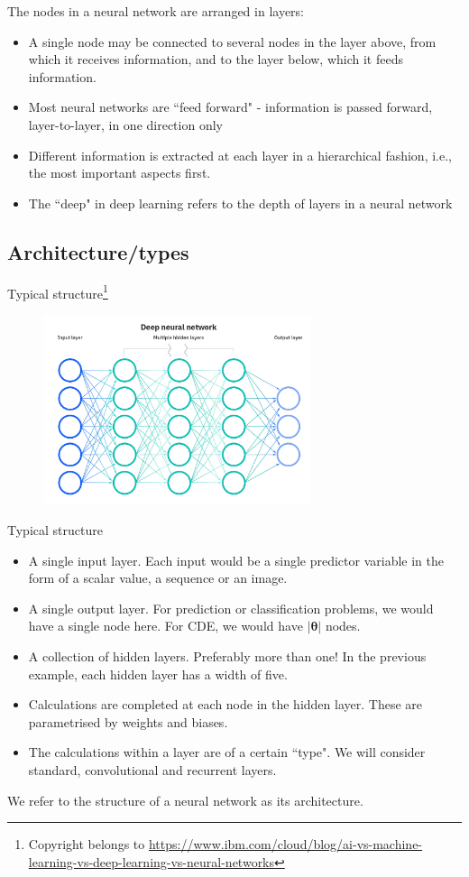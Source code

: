 \documentclass{beamer}
\begin{document}
\begin{frame}
 The nodes in a neural network are arranged in layers:
\begin{itemize}
\item A single node may be connected to several nodes in the layer above, from which it receives information, and to the layer below, which it feeds information. 
\item Most neural networks are ``feed forward" - information is passed forward, layer-to-layer, in one direction only
\item Different information is extracted at each layer in a hierarchical fashion, i.e., the most important aspects first.
\item The ``deep" in deep learning refers to the depth of layers in a neural network
\end{itemize}
\end{frame}
\subsection{Architecture/types}
\begin{frame}{Typical structure\footnote{Copyright belongs to \url{https://www.ibm.com/cloud/blog/ai-vs-machine-learning-vs-deep-learning-vs-neural-networks}}}
\begin{figure}
\includegraphics[width=0.7\textwidth]{Images/nn.jpg}
\end{figure}
\end{frame}
\begin{frame}{Typical structure}
\begin{itemize}
\item A single input layer. Each input would be a single predictor variable in the form of a scalar value, a sequence or an image.
\item A single output layer. For prediction or classification problems, we would have a single node here. For CDE, we would have $|\boldsymbol{\theta}|$ nodes.
\item A collection of hidden layers. Preferably more than one! In the previous example, each hidden layer has a width of five.
\item Calculations are completed at each node in the hidden layer. These are parametrised by weights and biases.
\item The calculations within a layer are of a certain ``type". We will consider standard, convolutional and recurrent layers.
\end{itemize}
We refer to the structure of a neural network as its architecture.
\end{frame}
\end{document}
